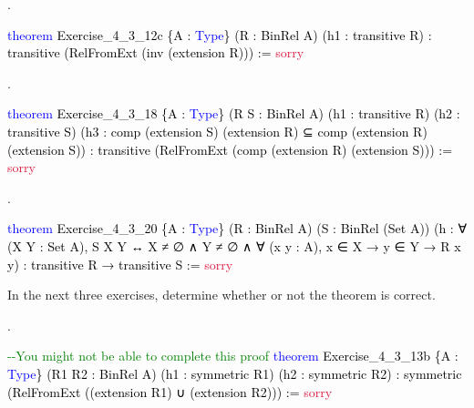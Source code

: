 \documentclass[
  letterpaper,
  DIV=11,
  numbers=noendperiod]{scrreprt}
\newenvironment{Shaded}{\begin{snugshade}}{\end{snugshade}}
\newcommand{\CommentTok}[1]{\textcolor[rgb]{0.37,0.37,0.37}{#1}}
\newcommand{\ConstantTok}[1]{\textcolor[rgb]{0.56,0.35,0.01}{#1}}
\newcommand{\KeywordTok}[1]{\textcolor[rgb]{0.00,0.23,0.31}{#1}}
\newcommand{\NormalTok}[1]{\textcolor[rgb]{0.00,0.23,0.31}{#1}}
\renewcommand{\NormalTok}[1]{\textcolor[HTML]{000000}{#1}}
\renewcommand{\KeywordTok}[1]{\textcolor[HTML]{0000FF}{#1}}
\renewcommand{\CommentTok}[1]{\textcolor[HTML]{008000}{#1}}
\renewcommand{\ConstantTok}[1]{\textcolor[HTML]{DC143C}{#1}}
\newcommand{\nobreakShaded}{\renewenvironment{Shaded}
	{\begin{tcolorbox}[frame hidden, enhanced, interior hidden, boxrule=0pt,
		borderline west={3pt}{0pt}{shadecolor}, sharp corners]}
	{\end{tcolorbox}}}
\newenvironment{numex}[1]
	{\begin{minipage}[t]{0.04\textwidth}\vspace{8pt}{#1}.
		\end{minipage}\nobreakShaded\begin{minipage}[t]{0.96\textwidth}\vspace{0pt}}
	{\end{minipage}}
\newenvironment{mdsk}
	{\medskip}
	{}
\theoremstyle{remark}
\begin{document}
\begin{numex}{5}

\begin{Shaded}
\begin{Highlighting}[]
\KeywordTok{theorem}\NormalTok{ Exercise\_4\_3\_12c \{A : }\KeywordTok{Type}\NormalTok{\} (R : BinRel A) (h1 : transitive R) :}
\NormalTok{    transitive (RelFromExt (inv (extension R))) := }\ConstantTok{sorry}
\end{Highlighting}
\end{Shaded}

\end{numex}

\begin{numex}{6}

\begin{Shaded}
\begin{Highlighting}[]
\KeywordTok{theorem}\NormalTok{ Exercise\_4\_3\_18 \{A : }\KeywordTok{Type}\NormalTok{\}}
\NormalTok{    (R S : BinRel A) (h1 : transitive R) (h2 : transitive S)}
\NormalTok{    (h3 : comp (extension S) (extension R) ⊆}
\NormalTok{      comp (extension R) (extension S)) :}
\NormalTok{    transitive (RelFromExt (comp (extension R) (extension S))) := }\ConstantTok{sorry}
\end{Highlighting}
\end{Shaded}

\end{numex}

\begin{numex}{7}

\begin{Shaded}
\begin{Highlighting}[]
\KeywordTok{theorem}\NormalTok{ Exercise\_4\_3\_20 \{A : }\KeywordTok{Type}\NormalTok{\} (R : BinRel A) (S : BinRel (Set A))}
\NormalTok{    (h : ∀ (X Y : Set A), S X Y ↔ X ≠ ∅ ∧ Y ≠ ∅ ∧}
\NormalTok{    ∀ (x y : A), x ∈ X → y ∈ Y → R x y) :}
\NormalTok{    transitive R → transitive S := }\ConstantTok{sorry}
\end{Highlighting}
\end{Shaded}

\end{numex}

\begin{mdsk}

\end{mdsk}

In the next three exercises, determine whether or not the theorem is
correct.

\begin{numex}{8}

\begin{Shaded}
\begin{Highlighting}[]
\CommentTok{{-}{-}You might not be able to complete this proof}
\KeywordTok{theorem}\NormalTok{ Exercise\_4\_3\_13b \{A : }\KeywordTok{Type}\NormalTok{\}}
\NormalTok{    (R1 R2 : BinRel A) (h1 : symmetric R1) (h2 : symmetric R2) :}
\NormalTok{    symmetric (RelFromExt ((extension R1) ∪ (extension R2))) := }\ConstantTok{sorry}
\end{Highlighting}
\end{Shaded}

\end{numex}
\end{document}
